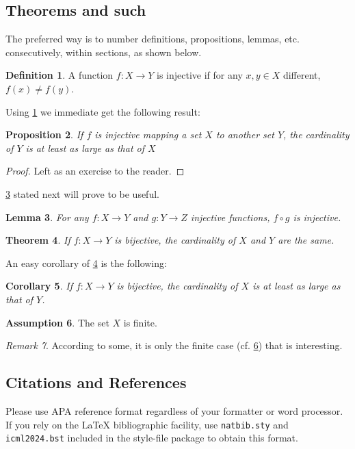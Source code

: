 \documentclass{article}
\theoremstyle{plain}
\newtheorem{theorem}{Theorem}[section]
\newtheorem{proposition}[theorem]{Proposition}
\newtheorem{lemma}[theorem]{Lemma}
\newtheorem{corollary}[theorem]{Corollary}
\theoremstyle{definition}
\newtheorem{definition}[theorem]{Definition}
\newtheorem{assumption}[theorem]{Assumption}
\theoremstyle{remark}
\newtheorem{remark}[theorem]{Remark}
\begin{document}
\subsection{Theorems and such}
The preferred way is to number definitions, propositions, lemmas, etc. consecutively, within sections, as shown below.
\begin{definition}
\label{def:inj}
A function $f:X \to Y$ is injective if for any $x,y\in X$ different, $f(x)\ne f(y)$.
\end{definition}
Using \cref{def:inj} we immediate get the following result:
\begin{proposition}
If $f$ is injective mapping a set $X$ to another set $Y$, 
the cardinality of $Y$ is at least as large as that of $X$
\end{proposition}
\begin{proof} 
Left as an exercise to the reader. 
\end{proof}
\cref{lem:usefullemma} stated next will prove to be useful.
\begin{lemma}
\label{lem:usefullemma}
For any $f:X \to Y$ and $g:Y\to Z$ injective functions, $f \circ g$ is injective.
\end{lemma}
\begin{theorem}
\label{thm:bigtheorem}
If $f:X\to Y$ is bijective, the cardinality of $X$ and $Y$ are the same.
\end{theorem}
An easy corollary of \cref{thm:bigtheorem} is the following:
\begin{corollary}
If $f:X\to Y$ is bijective, 
the cardinality of $X$ is at least as large as that of $Y$.
\end{corollary}
\begin{assumption}
The set $X$ is finite.
\label{ass:xfinite}
\end{assumption}
\begin{remark}
According to some, it is only the finite case (cf. \cref{ass:xfinite}) that is interesting.
\end{remark}

\subsection{Citations and References}

Please use APA reference format regardless of your formatter
or word processor. If you rely on the \LaTeX\/ bibliographic
facility, use \texttt{natbib.sty} and \texttt{icml2024.bst}
included in the style-file package to obtain this format.
\end{document}
